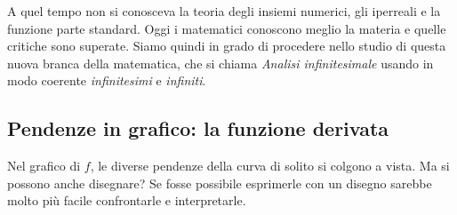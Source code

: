 A quel tempo non si conosceva la teoria degli insiemi numerici, 
gli iperreali e la funzione parte standard.
Oggi i matematici conoscono meglio la materia e quelle critiche 
sono superate. 
Siamo quindi in grado di procedere nello studio di questa nuova branca 
della matematica, che si chiama \emph{Analisi infinitesimale} 
usando in modo coerente \emph{infinitesimi} e \emph{infiniti}.

\subsection{Pendenze in grafico: la funzione derivata}
\label{subsec:pendenze_grafico}

Nel grafico di \(f\), le diverse pendenze della curva di solito si colgono a 
vista. Ma si possono anche disegnare? Se fosse possibile esprimerle con un 
disegno sarebbe molto più facile confrontarle e interpretarle.


